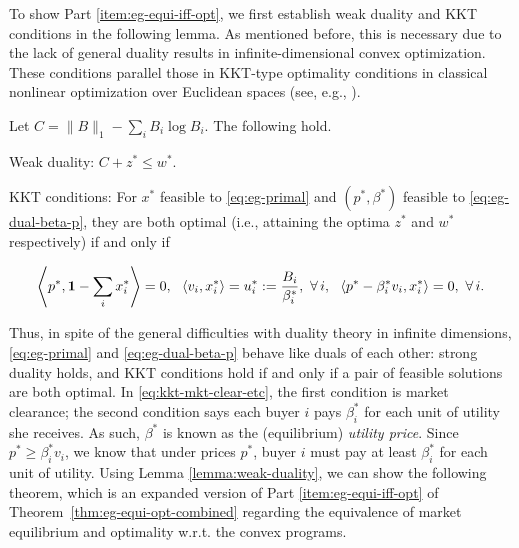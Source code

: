 To show Part \ref{item:eg-equi-iff-opt}, we first establish weak duality and KKT conditions in the following lemma. 
As mentioned before, this is necessary due to the lack of general duality results in infinite-dimensional convex optimization.
These conditions parallel those in KKT-type optimality conditions in classical nonlinear optimization over Euclidean spaces (see, e.g., \citet[\S 3.3.1]{bertsekas1999nonlinear}).
\begin{lemma}
	Let $C = \|B\|_1 - \sum_i B_i \log B_i$. The following hold.
	\begin{enumerate*}[(a)]
		\item Weak duality: $C + z^* \leq w^*$. \label{item:eg-weak-duality}
		\item KKT conditions: For $x^*$ feasible to \eqref{eq:eg-primal} and $(p^*, \beta^*)$ feasible to \eqref{eq:eg-dual-beta-p}, they are both optimal (i.e., attaining the optima $z^*$ and $w^*$ respectively) if and only if \label{item:eg-KKT-iff}
	\end{enumerate*} 
	\begin{align}
		\left \langle p^*, \ones - \sum_i x^*_i\right \rangle = 0, \ \ 
		\langle v_i, x_i^*\rangle = u^*_i :=  \frac{B_i}{\beta^*_i}, \ \forall\, i, \ \ 
		\langle p^* - \beta^*_i v_i, x^*_i \rangle = 0,\ \forall\, i.
		\label{eq:kkt-mkt-clear-etc}
	\end{align} 
	\label{lemma:weak-duality}
\end{lemma}
Thus, in spite of the general difficulties with duality theory in infinite dimensions, \eqref{eq:eg-primal} and \eqref{eq:eg-dual-beta-p} behave like duals of each other: strong duality holds, and KKT conditions hold if and only if a pair of feasible solutions are both optimal. In \eqref{eq:kkt-mkt-clear-etc}, the first condition is market clearance; the second condition says each buyer $i$ pays $\beta^*_i$ for each unit of utility she receives. As such, $\beta^*$ is known as the (equilibrium) \emph{utility price}. Since $p^* \geq \beta^*_i v_i$, we know that under prices $p^*$, buyer $i$ must pay at least $\beta^*_i$ for each unit of utility. Using Lemma \ref{lemma:weak-duality}, we can show the following theorem, which is an expanded version of Part \ref{item:eg-equi-iff-opt} of Theorem~\ref{thm:eg-equi-opt-combined} regarding the equivalence of market equilibrium and optimality w.r.t. the convex programs.
